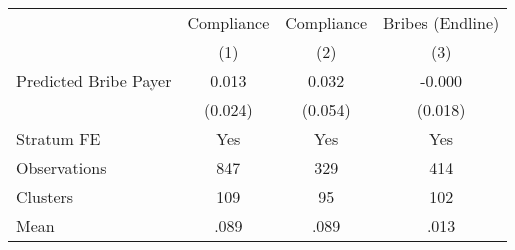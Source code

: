{
\def\sym#1{\ifmmode^{#1}\else\(^{#1}\)\fi}
\begin{tabular}{l*{3}{c}}
\hline\hline
                &\multicolumn{1}{c}{Compliance}&\multicolumn{1}{c}{Compliance}&\multicolumn{1}{c}{Bribes (Endline)}\\
                &\multicolumn{1}{c}{(1)}         &\multicolumn{1}{c}{(2)}         &\multicolumn{1}{c}{(3)}         \\
\hline
Predicted Bribe Payer&    0.013         &    0.032         &   -0.000         \\
                &  (0.024)         &  (0.054)         &  (0.018)         \\
Stratum FE      &      Yes         &      Yes         &      Yes         \\
\hline
Observations    &      847         &      329         &      414         \\
Clusters        &      109         &       95         &      102         \\
Mean            &     .089         &     .089         &     .013         \\
\hline\hline
\end{tabular}
}
